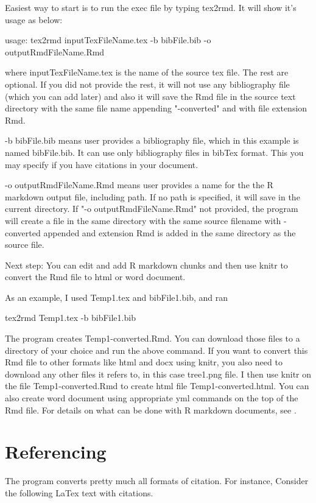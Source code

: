 \documentclass[12pt,svgnames]{article}
\begin{document}
Easiest way to start is to run the exec file by typing tex2rmd. It will show it's usage as below:

usage: tex2rmd inputTexFileName.tex -b bibFile.bib -o outputRmdFileName.Rmd 

where inputTexFileName.tex is the name of the source tex file. The rest are optional. If you did not provide the rest, it will not use any bibliography file (which you can add later) and also it will save the Rmd file in the source text directory with the same file name appending "-converted" and with file extension Rmd.  

-b bibFile.bib means user provides a bibliography file, which in this example is named bibFile.bib.  It can use only bibliography files in bibTex format. This you may specify if you have citations in your document.

-o outputRmdFileName.Rmd means user provides a name for the the R markdown output file, including path. If no path is specified, it will save in the current directory. If "-o outputRmdFileName.Rmd" not provided, the program will create a file in the same directory with the same source filename with -converted appended and extension Rmd is added in the same directory as the source file.

Next step: You can edit and add R markdown chunks and then use knitr to convert the Rmd file to html or word document.  

As an example, I used Temp1.tex and bibFile1.bib, and ran  

tex2rmd Temp1.tex -b bibFile1.bib  

The program creates Temp1-converted.Rmd. You can download those files to a directory of your choice and run the above command.  If you want to convert this Rmd file to other formats like html and docx using knitr, you also need to download any other files it refers to, in this case tree1.png file. I then use knitr on the file Temp1-converted.Rmd to create html file Temp1-converted.html. You can also create word document using appropriate yml commands on the top of the Rmd file. For details on what can be done with R markdown documents, see \cite{Allaire.etal_2020,Xie.Riederer_2020}.

\section {Referencing}\label{sec3}
The program converts pretty much all formats of citation.  For instance, Consider the following LaTex text with citations.
\end{document}
